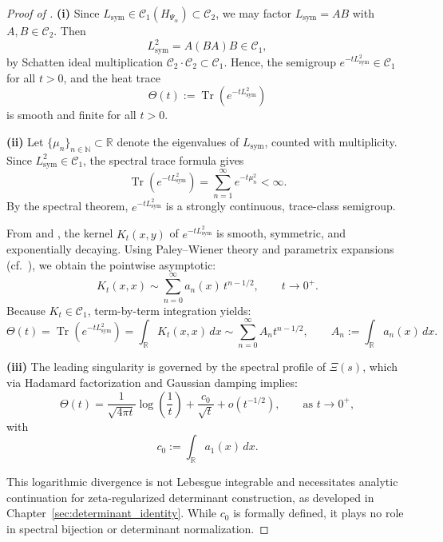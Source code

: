 \begin{proof}[Proof of ]
\textbf{(i)} Since \( L_{\mathrm{sym}} \in \mathcal{C}_1(H_{\Psi_\alpha}) \subset \mathcal{C}_2 \), we may factor \( L_{\mathrm{sym}} = AB \) with \( A, B \in \mathcal{C}_2 \). Then
\[
L_{\mathrm{sym}}^2 = A(BA)B \in \mathcal{C}_1,
\]
by Schatten ideal multiplication \( \mathcal{C}_2 \cdot \mathcal{C}_2 \subset \mathcal{C}_1 \). Hence, the semigroup \( e^{-tL_{\mathrm{sym}}^2} \in \mathcal{C}_1 \) for all \( t > 0 \), and the heat trace
\[
\Theta(t) := \operatorname{Tr}(e^{-tL_{\mathrm{sym}}^2})
\]
is smooth and finite for all \( t > 0 \).

\textbf{(ii)} Let \( \{ \mu_n \}_{n \in \mathbb{N}} \subset \mathbb{R} \) denote the eigenvalues of \( L_{\mathrm{sym}} \), counted with multiplicity. Since \( L_{\mathrm{sym}}^2 \in \mathcal{C}_1 \), the spectral trace formula gives
\[
\operatorname{Tr}(e^{-tL_{\mathrm{sym}}^2}) = \sum_{n=1}^{\infty} e^{-t \mu_n^2} < \infty.
\]
By the spectral theorem, \( e^{-tL_{\mathrm{sym}}^2} \) is a strongly continuous, trace-class semigroup.

From  and , the kernel \( K_t(x,y) \) of \( e^{-tL_{\mathrm{sym}}^2} \) is smooth, symmetric, and exponentially decaying. Using Paley–Wiener theory and parametrix expansions (cf.~\cite[Ch.~III]{Korevaar2004Tauberian}), we obtain the pointwise asymptotic:
\[
K_t(x,x) \sim \sum_{n=0}^{\infty} a_n(x)\, t^{n - 1/2}, \qquad t \to 0^+.
\]
Because \( K_t \in \mathcal{C}_1 \), term-by-term integration yields:
\[
\Theta(t) = \operatorname{Tr}(e^{-tL_{\mathrm{sym}}^2}) = \int_{\mathbb{R}} K_t(x,x) \, dx \sim \sum_{n=0}^{\infty} A_n t^{n - 1/2}, \qquad A_n := \int_{\mathbb{R}} a_n(x) \, dx.
\]

\textbf{(iii)} The leading singularity is governed by the spectral profile of \( \Xi(s) \), which via Hadamard factorization and Gaussian damping implies:
\[
\Theta(t) = \frac{1}{\sqrt{4\pi t}} \log\left( \frac{1}{t} \right) + \frac{c_0}{\sqrt{t}} + o(t^{-1/2}), \qquad \text{as } t \to 0^+,
\]
with
\[
c_0 := \int_{\mathbb{R}} a_1(x)\, dx.
\]

This logarithmic divergence is not Lebesgue integrable and necessitates analytic continuation for zeta-regularized determinant construction, as developed in Chapter~\ref{sec:determinant_identity}. While \( c_0 \) is formally defined, it plays no role in spectral bijection or determinant normalization.
\end{proof}
